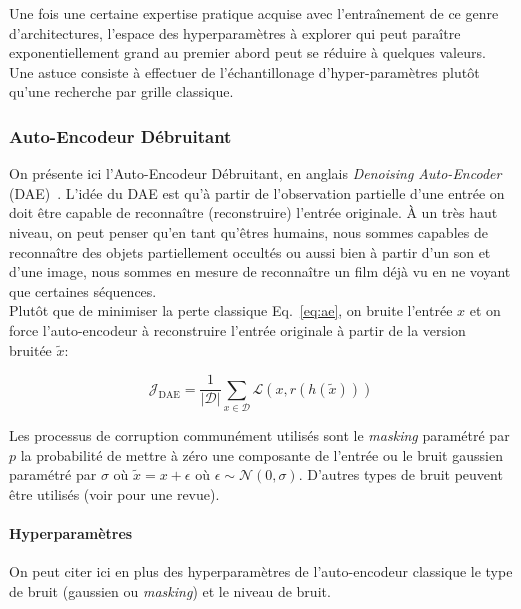 Une fois une certaine expertise pratique acquise avec l'entraînement de ce
genre d'architectures, l'espace des hyperparamètres à explorer qui peut
paraître exponentiellement grand au premier abord peut se réduire à quelques
valeurs.  Une astuce consiste à effectuer de l'échantillonage
d'hyper-paramètres \citep{rnn14} plutôt qu'une recherche par grille classique.

\subsubsection{Auto-Encodeur Débruitant}

On présente ici l'Auto-Encodeur Débruitant, en anglais \textit{Denoising
Auto-Encoder} (DAE)~\citep{VincentPLarochelleH2008}.  L'idée du DAE est qu'à partir de l'observation partielle
d'une entrée on doit être capable de reconnaître (reconstruire) l'entrée
originale. À un très haut niveau, on peut penser qu'en tant qu'êtres humains,
nous sommes capables de reconnaître des objets partiellement occultés ou aussi
bien à partir d'un son et d'une image, nous sommes en mesure de reconnaître un
film déjà vu en ne voyant que certaines séquences.  \\

Plutôt que de minimiser la perte classique Eq.~\ref{eq:ae}, on bruite l'entrée
$x$ et on force l'auto-encodeur à reconstruire l'entrée originale à partir de
la version bruitée $\tilde{x}$:

\begin{equation}
\mathcal{J}_{\textrm{DAE}} = \frac{1}{\vert \mathcal{D}\vert}\sum_{x\in\mathcal{D}}\mathcal{L}(x,r(h(\tilde{x})))
\label{eq:dae}
\end{equation}

Les processus de corruption communément utilisés sont le \textit{masking}
paramétré par $p$ la probabilité de mettre à zéro une composante de l'entrée ou
le bruit gaussien paramétré par $\sigma$ où $\tilde{x} = x + \epsilon$ où
$\epsilon \sim \mathcal{N}(0,\sigma)$. D'autres types de bruit
peuvent être utilisés (voir \cite{Vincent-JMLR-2010} pour une revue).

\paragraph{Hyperparamètres} On peut citer ici en plus des hyperparamètres de
l'auto-encodeur classique le type de bruit (gaussien ou \textit{masking}) et le niveau
de bruit.


